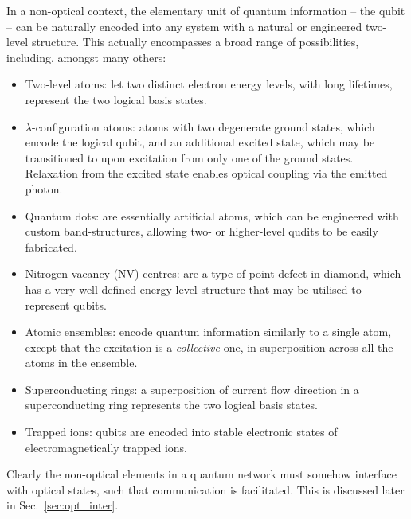 In a non-optical context, the elementary unit of quantum information -- the qubit -- can be naturally encoded into any system with a natural or engineered two-level structure. This actually encompasses a broad range of possibilities, including, amongst many others:
\begin{itemize}
\item {}Two-level atoms: let two distinct electron energy levels, with long lifetimes, represent the two logical basis states.
\item {}$\lambda$-configuration atoms: atoms with two degenerate ground states, which encode the logical qubit, and an additional excited state, which may be transitioned to upon excitation from only one of the ground states. Relaxation from the excited state enables optical coupling via the emitted photon.
\item {}Quantum dots: are essentially artificial atoms, which can be engineered with custom band-structures, allowing two- or higher-level qudits to be easily fabricated.
\item {}Nitrogen-vacancy (NV) centres: are a type of point defect in diamond, which has a very well defined energy level structure that may be utilised to represent qubits.
\item {}Atomic ensembles: encode quantum information similarly to a single atom, except that the excitation is a \textit{collective} one, in superposition across all the atoms in the ensemble.
\item {}Superconducting rings: a superposition of current flow direction in a superconducting ring represents the two logical basis states.
\item {}Trapped ions: qubits are encoded into stable electronic states of electromagnetically trapped ions.
\end{itemize}

Clearly the non-optical elements in a quantum network must somehow interface with optical states, such that communication is facilitated. This is discussed later in Sec.~\ref{sec:opt_inter}.